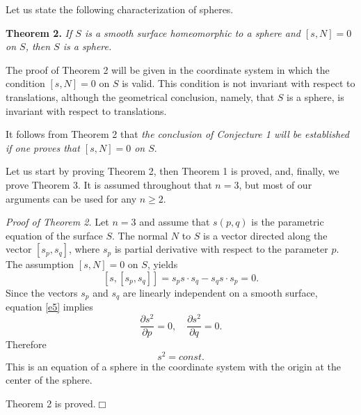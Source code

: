 \documentclass[12pt,leqno]{article}
\begin{document}
Let us state the following characterization of spheres.

{\bf Theorem 2.} {\it If $S$ is a smooth surface homeomorphic to a sphere
and $[s,N]=0$ on $S$, then $S$ is a sphere.}

The proof of Theorem 2 will be given in the coordinate system in which
the condition $[s,N]=0$ on $S$ is valid. This condition is not invariant
with respect to translations, although the geometrical conclusion, namely,
that $S$ is a sphere, is invariant with respect to translations.

It follows from Theorem 2 that {\it the conclusion of Conjecture 1 will
be established if one proves that $[s,N]=0$ on $S$}.

Let us start by  proving Theorem 2, then Theorem 1 is proved, and,
finally, we prove Theorem 3.
It is assumed throughout that $n=3$, but most of our arguments can be used
for any $n\ge 2$.

{\it Proof of Theorem 2.} Let $n=3$ and
assume that $s(p,q)$ is the parametric equation of the surface $S$.
The normal $N$ to $S$ is a vector directed along the vector
$[s_{p},s_{q}]$,
where $s_{p}$ is partial derivative with respect to the
parameter $p$.  The assumption $[s, N]=0$ on $S$, yields
\begin{equation}
\label{e5}
[s, [s_p, s_q]]=s_p s\cdot s_q-s_q s\cdot s_p=0.
\end{equation}
Since the vectors $s_p$ and $s_q$ are linearly independent
on a smooth surface, equation \eqref{e5}
implies
\begin{equation}
\label{e6}
\frac{\partial s^2}{\partial p}=0,\quad \frac{\partial s^2}
{\partial q}=0.
\end{equation}
Therefore
\begin{equation}
\label{e7}
s^2=const.
\end{equation}
This is an equation of a sphere in the coordinate system with the origin
at the center of the sphere.



Theorem 2 is proved.\hfill $\Box$
\end{document}
